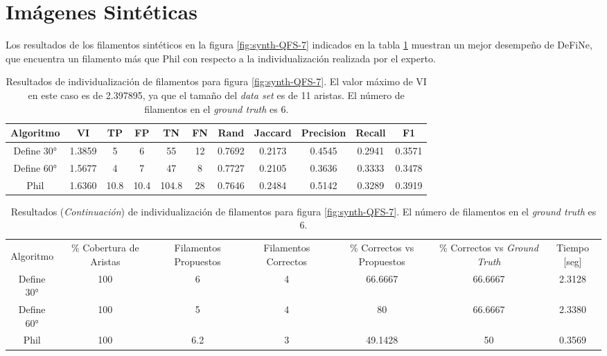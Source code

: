\section{Im\'agenes Sint\'eticas}

Los resultados de los filamentos sint\'eticos en la figura \ref{fig:synth-QFS-7} indicados en la tabla \ref{tab:synth-QFS-7-Results} muestran un mejor desempe\~no de DeFiNe, que encuentra un filamento m\'as que Phil con respecto a la individualizaci\'on realizada por el experto.

\begin{table}[h]
    \centering
    \begin{tabular}{|c|c|c|c|c|c|c|c|c|c|c|}
    \hline
        Algoritmo & VI & TP & FP &TN &FN & Rand	& Jaccard &	Precision &	Recall &	F1 \\ \hline
        Define 30° & 1.3859 & 5 & 6 & 55 & 12 & 0.7692  & 0.2173 & 0.4545 & 0.2941 & 0.3571\\
        Define 60° & 1.5677 & 4 & 7 & 47 & 8  & 0.7727  & 0.2105  & 0.3636  & 0.3333 & 0.3478\\ 
        Phil & 1.6360 & 10.8 & 10.4 & 104.8 & 28 & 0.7646 & 0.2484 & 0.5142 & 0.3289 & 0.3919\\
        \hline
    \end{tabular}
    \caption{Resultados de individualizaci\'on de filamentos para figura \ref{fig:synth-QFS-7}. El valor m\'aximo de VI en este caso es de 2.397895, ya que el tama\~no del {\it data set} es de 11 aristas. El n\'umero de filamentos en el {\it ground truth} es 6.}
    \label{tab:synth-QFS-7-Results}
\end{table}
\addtocounter{table}{-1}
\begin{table}[h]
    \centering
    \begin{tabular}{|c|c|c|c|c|c|c|}
    \hline
         & \multirow{4}{2cm}{\centering \% Cobertura de Aristas} & \multirow{4}{2cm}{Filamentos Propuestos} & \multirow{4}{2cm}{Filamentos Correctos} & \multirow{4}{2.5cm}{\% Correctos vs Propuestos} & \multirow{4}{2.5cm}{\centering \% Correctos vs {\it Ground Truth}} & \multirow{4}{1.2cm}{\centering Tiempo [seg]} \\
         &  &  &  & & &  \\
        Algoritmo &  &  &  & & &  \\
        &  &  &  & & &  \\ \hline
        Define 30° & 100 & 6 & 4 & 66.6667 & 66.6667 & 2.3128\\
        Define 60° & 100 & 5 & 4 & 80 & 66.6667 & 2.3380\\ 
        Phil & 100 & 6.2 & 3 & 49.1428 & 50  & 0.3569\\
        \hline
    \end{tabular}
    \caption{Resultados ({\it Continuaci\'on}) de individualizaci\'on de filamentos para figura \ref{fig:synth-QFS-7}. El n\'umero de filamentos en el {\it ground truth} es 6.}
\end{table}


